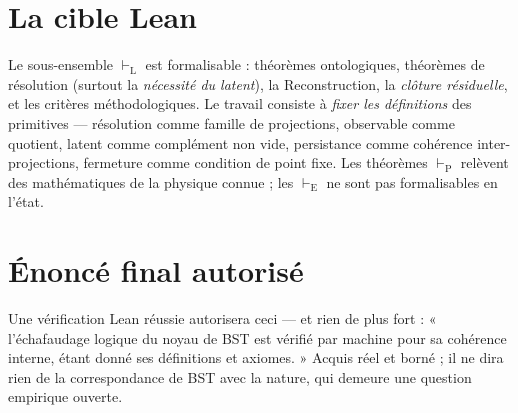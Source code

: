 \documentclass[11pt]{book}
\begin{document}
\section{La cible Lean}
Le sous-ensemble $\vdash_{\mathrm{L}}$ est formalisable : théorèmes ontologiques, théorèmes de résolution (surtout la \emph{nécessité du latent}), la Reconstruction, la \emph{clôture résiduelle}, et les critères méthodologiques. Le travail consiste à \emph{fixer les définitions} des primitives --- résolution comme famille de projections, observable comme quotient, latent comme complément non vide, persistance comme cohérence inter-projections, fermeture comme condition de point fixe. Les théorèmes $\vdash_{\mathrm{P}}$ relèvent des mathématiques de la physique connue ; les $\vdash_{\mathrm{E}}$ ne sont pas formalisables en l'état.

\section{Énoncé final autorisé}
Une vérification Lean réussie autorisera ceci --- et rien de plus fort : « l'échafaudage logique du noyau de BST est vérifié par machine pour sa cohérence interne, étant donné ses définitions et axiomes. » Acquis réel et borné ; il ne dira rien de la correspondance de BST avec la nature, qui demeure une question empirique ouverte.
\end{document}
